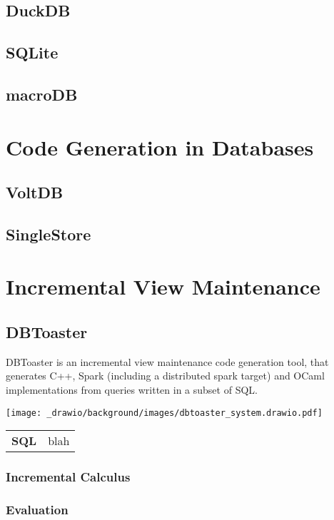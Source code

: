 \subsection{DuckDB}
\subsection{SQLite}
\subsection{macroDB}

\section{Code Generation in Databases}
\subsection{VoltDB}
\subsection{SingleStore}

\section{Incremental View Maintenance}

\subsection{DBToaster}
DBToaster is an incremental view maintenance code generation tool, that generates C++, Spark (including a distributed spark target) and OCaml implementations from queries written in a subset of SQL.
\begin{center}
    \texttt{[image: \_drawio/background/images/dbtoaster\_system.drawio.pdf]}
\end{center}

\begin{center}
    \begin{tabular}{l p{}}
        \textbf{SQL} & blah \\
    \end{tabular}
\end{center}
\subsubsection{Incremental Calculus}
\subsubsection{Evaluation}




